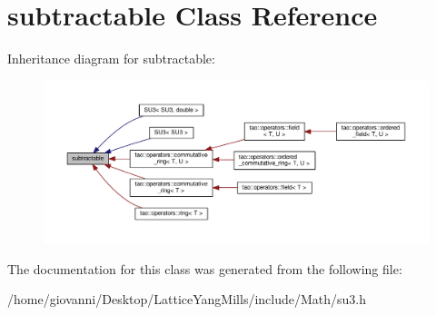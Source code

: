 \hypertarget{classtao_1_1operators_1_1subtractable}{}\section{subtractable Class Reference}
\label{classtao_1_1operators_1_1subtractable}


Inheritance diagram for subtractable\+:\nopagebreak
\begin{figure}[H]
\begin{center}
\leavevmode
\includegraphics[width=350pt]{classtao_1_1operators_1_1subtractable__inherit__graph}
\end{center}
\end{figure}


The documentation for this class was generated from the following file\+:\begin{DoxyCompactItemize}
\item 
/home/giovanni/\+Desktop/\+Lattice\+Yang\+Mills/include/\+Math/su3.\+h\end{DoxyCompactItemize}
